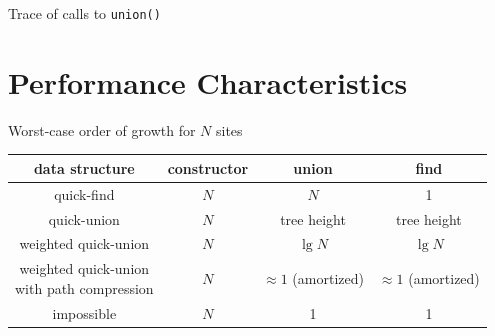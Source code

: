 \documentclass[8pt,a4paper,compress]{beamer}
\begin{document}
\begin{frame}[fragile]
\pause

Trace of calls to \lstinline{union()}

\begin{center}
\end{center}
\end{frame}

\section{Performance Characteristics}
\begin{frame}[fragile]
\pause

Worst-case order of growth for $N$ sites
\begin{center}
\begin{tabular}{cccc}
data structure & constructor & union & find \\ \hline
quick-find & $N$ & $N$ & 1 \\
quick-union & $N$ & tree height & tree height \\
weighted quick-union & $N$ & $\lg N$ & $\lg N$ \\
\makecell{weighted quick-union \\ with path compression} & $N$ & $\approx 1$ (amortized) & $\approx 1$ (amortized) \\
impossible & $N$ & 1 & 1
\end{tabular} 
\end{center}
\end{frame}
\end{document}
